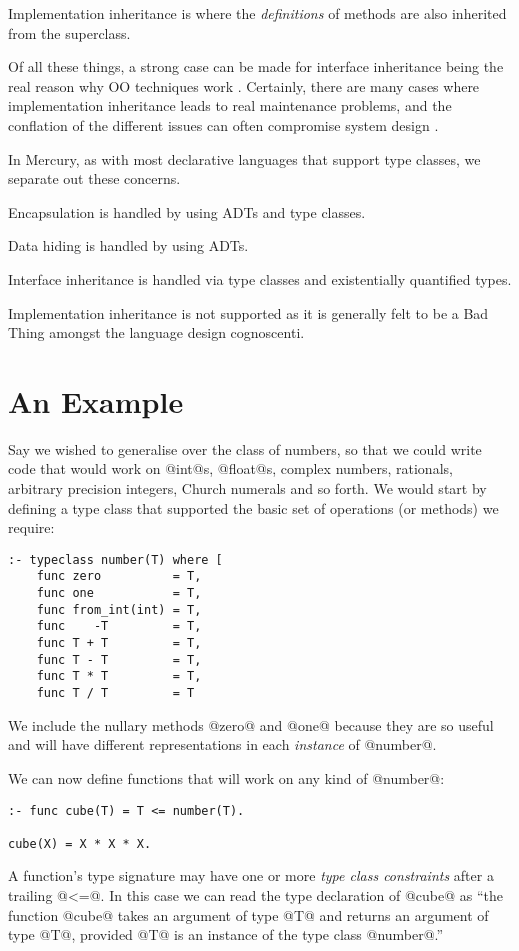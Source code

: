 Implementation inheritance is where the \emph{definitions} of methods
are also inherited from the superclass.

Of all these things, a strong case can be made for interface inheritance
being the real reason why OO techniques work .
Certainly, there are many cases where implementation inheritance leads
to real maintenance problems, and the conflation of the different issues
can often compromise system design .

In Mercury, as with most declarative languages that support type
classes, we separate out these concerns.

Encapsulation is handled by using ADTs and type classes.

Data hiding is handled by using ADTs.

Interface inheritance is handled via type classes and existentially
quantified types.

Implementation inheritance is not supported as it is generally felt to
be a Bad Thing amongst the language design cognoscenti.

\section{An Example}

Say we wished to generalise over the class of numbers, so that we could
write code that would work on @int@s, @float@s, complex numbers,
rationals, arbitrary precision integers, Church numerals and so forth.
We would start by defining a type class that supported the basic set of
operations (or methods) we require:
\begin{verbatim}
:- typeclass number(T) where [
	func zero          = T,
	func one           = T,
	func from_int(int) = T,
	func    -T         = T,
	func T + T         = T,
	func T - T         = T,
	func T * T         = T,
	func T / T         = T
\end{verbatim}
We include the nullary methods @zero@ and @one@ because they are so
useful and will have different representations in each \emph{instance}
of @number@.

We can now define functions that will work on any kind of @number@:
\begin{verbatim}
:- func cube(T) = T <= number(T).

cube(X) = X * X * X.
\end{verbatim}
A function's type signature may have one or more \emph{type class
constraints} after a trailing @<=@.  In this case we can read the type
declaration of @cube@ as ``the function @cube@ takes an argument of type
@T@ and returns an argument of type @T@, provided @T@ is an instance of
the type class @number@.''


